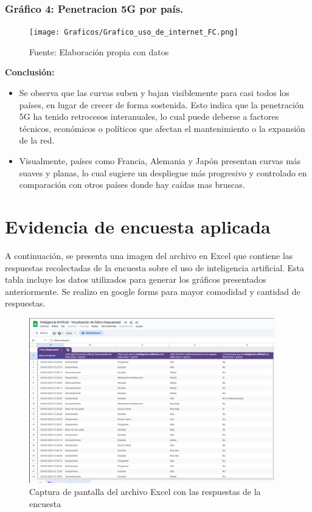 \documentclass[12pt, a4paper]{article}
\begin{document}
\subsubsection*{Gráfico 4: Penetracion 5G por país.}
\begin{figure}[H]
    \centering
    \texttt{[image: Graficos/Grafico\_uso\_de\_internet\_FC.png]}
    \caption[6]{Fuente: Elaboración propia con datos}

\end{figure}


\textbf{Conclusión:}  
\begin{itemize}
    \item Se observa que las curvas suben y bajan visiblemente para casi todos los países, en lugar de crecer de forma sostenida. Esto indica que la penetración 5G ha tenido retrocesos interanuales, lo cual puede deberse a factores técnicos, económicos o políticos que afectan el mantenimiento o la expansión de la red.
    \item Visualmente, países como Francia, Alemania y Japón presentan curvas más suaves y planas, lo cual sugiere un despliegue más progresivo y controlado en comparación con otros países donde hay caídas mas bruscas.

\end{itemize}

\section{Evidencia de encuesta aplicada}

A continuación, se presenta una imagen del archivo en Excel que contiene las respuestas recolectadas de la encuesta sobre el uso de inteligencia artificial. Esta tabla incluye los datos utilizados para generar los gráficos presentados anteriormente. Se realizo en google forms para mayor comodidad y cantidad de respuestas. 

\begin{figure}[H]
    \centering
    \includegraphics[width=0.95\textwidth]{Graficos/excel.png} %
    \caption{Captura de pantalla del archivo Excel con las respuestas de la encuesta}
\end{figure}
\end{document}
